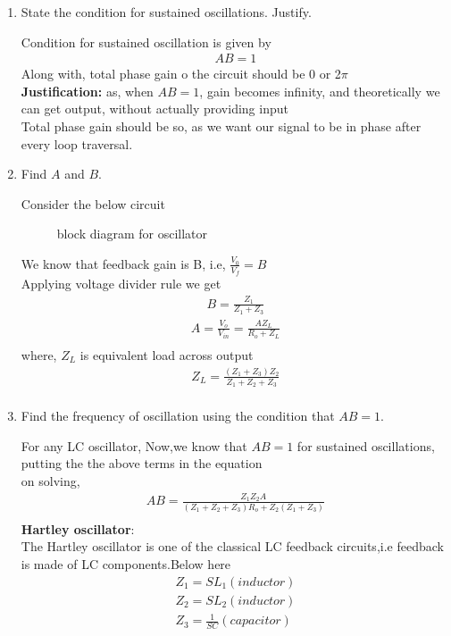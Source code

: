 \begin{enumerate}[label=\thesection.\arabic*.,ref=\thesection.\theenumi]
\item State the condition for sustained oscillations. Justify.

\solution Condition for sustained oscillation is given by\\
\begin{align}
    AB = 1
\end{align}
Along with, total phase gain o the circuit should be 0 or 2$\pi$\\
\textbf{Justification:} as, when $ AB =1 $, gain becomes infinity, and theoretically we can get output, without actually providing input\\
Total phase gain should be so, as we want our signal to be in phase after every loop traversal.\\


\item Find $A$ and $B$.

\solution Consider the below circuit
\begin{figure}[!ht]
    \begin{center}
		\resizebox{\columnwidth}{!}{}
		
	\end{center}
\caption{block diagram for oscillator}
\label{fig:ee18btech11019_block2}
\end{figure}
We know that feedback gain is B, i.e, $\frac{V_0}{V_f} = B$\\
Applying voltage divider rule we get
\begin{align}
    B = \frac{Z_1}{Z_1 + Z_3}
\end{align}
\begin{align}
    A = \frac{V_o}{V_{in}} = \frac{AZ_L}{R_o + Z_L}\\
\end{align}    
    where, $Z_L$ is equivalent load across output
\begin{align}    
    Z_L = \frac{(Z_1 + Z_3)Z_2}{Z_1+Z_2+Z_3}\\
\end{align}


\item Find the frequency of oscillation using the condition that $AB = 1$.

\solution For any LC oscillator, 
Now,we know that $AB = 1$ for sustained oscillations, putting the the above terms in the equation\\
on solving,\\
\begin{align}    
    AB = \frac{Z_1Z_2A}{(Z_1+Z_2+Z_3)R_o+ Z_2(Z_1+Z_3)}\\
\end{align}    
\textbf{Hartley oscillator}:\\
The Hartley oscillator is one of the classical LC feedback circuits,i.e feedback is made of LC components.Below here 
\begin{align}
    Z_1 = SL_1 (inductor)\\
    Z_2 = SL_2 (inductor)\\
    Z_3 = \frac{1}{SC} (capacitor)
\end{align}


\end{enumerate}
